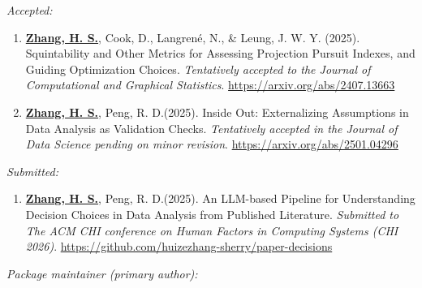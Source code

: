 \documentclass[10pt,a4paper]{article} %
\begin{document}
\noindent\textit{Accepted:}\vspace{-0.5em}
\begin{enumerate}[resume]

     \item \underline{\textbf{Zhang, H. S.}}, Cook, D., Langren\'e, N., \& Leung, J. W. Y. (2025). 
    Squintability and Other Metrics for Assessing Projection Pursuit Indexes, and Guiding 
    Optimization Choices. \emph{Tentatively accepted to the Journal of Computational and Graphical 
    Statistics}. \url{https://arxiv.org/abs/2407.13663}
    
    \item \underline{\textbf{Zhang, H. S.}}, Peng, R. D.(2025). Inside Out: Externalizing Assumptions 
    in Data Analysis as Validation Checks. \emph{Tentatively accepted in the Journal of Data Science pending on minor revision}. 
    \url{https://arxiv.org/abs/2501.04296}

\end{enumerate}

\noindent\textit{Submitted:}\vspace{-0.5em}
\begin{enumerate}[resume]

    
    \item \underline{\textbf{Zhang, H. S.}}, Peng, R. D.(2025). An LLM-based Pipeline for 
    Understanding Decision Choices in Data Analysis from Published Literature. 
    \emph{Submitted to The ACM CHI conference on Human Factors in Computing Systems (CHI 2026)}. 
    \url{https://github.com/huizezhang-sherry/paper-decisions}
    
  
\end{enumerate}


\noindent\textit{Package maintainer (primary author):}

\vspace{0.5em}

 \newline 
{} \newline
{} \newline 
\end{document}
